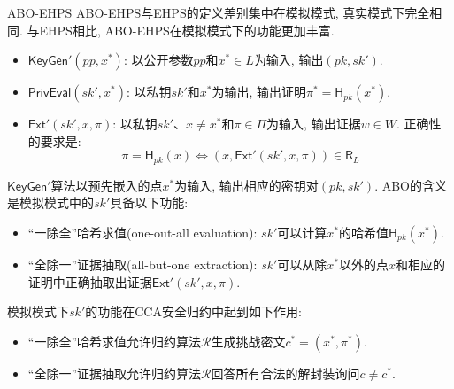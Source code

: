 \begin{definition}{ABO-EHPS}
ABO-EHPS与EHPS的定义差别集中在模拟模式, 真实模式下完全相同. 与EHPS相比, ABO-EHPS在模拟模式下的功能更加丰富.  
\begin{itemize}
    \item $\mathsf{KeyGen}'(pp, x^*)$: 以公开参数$pp$和$x^* \in L$为输入, 输出$(pk, sk')$. 

    \item $\mathsf{PrivEval}(sk', x^*)$: 以私钥$sk'$和$x^*$为输出, 输出证明$\pi^* = \mathsf{H}_{pk}(x^*)$. 

    \item $\mathsf{Ext}'(sk', x, \pi)$: 以私钥$sk'$、$x \neq x^*$和$\pi \in \Pi$为输入, 输出证据$w \in W$. 
    	正确性的要求是:  
    \begin{equation*}
        \pi  = \mathsf{H}_{pk}(x) \iff (x, \mathsf{Ext}'(sk', x, \pi)) \in \mathsf{R}_L
    \end{equation*}
\end{itemize}

$\mathsf{KeyGen}'$算法以预先嵌入的点$x^*$为输入, 输出相应的密钥对$(pk, sk')$. 
ABO的含义是模拟模式中的$sk'$具备以下功能: 
\begin{itemize}
    \item ``一除全''哈希求值(one-out-all evaluation): $sk'$可以计算$x^*$的哈希值$\mathsf{H}_{pk}(x^*)$. 
    \item ``全除一''证据抽取(all-but-one extraction): $sk'$可以从除$x^*$以外的点$x$和相应的证明中正确抽取出证据$\mathsf{Ext}'(sk', x, \pi)$.  
\end{itemize}
\end{definition}

\begin{remark}
模拟模式下$sk'$的功能在CCA安全归约中起到如下作用: 
\begin{itemize}
	\item ``一除全''哈希求值允许归约算法$\mathcal{R}$生成挑战密文$c^* = (x^*, \pi^*)$. 

    \item ``全除一''证据抽取允许归约算法$\mathcal{R}$回答所有合法的解封装询问$c \neq c^*$.
\end{itemize}
\end{remark}

